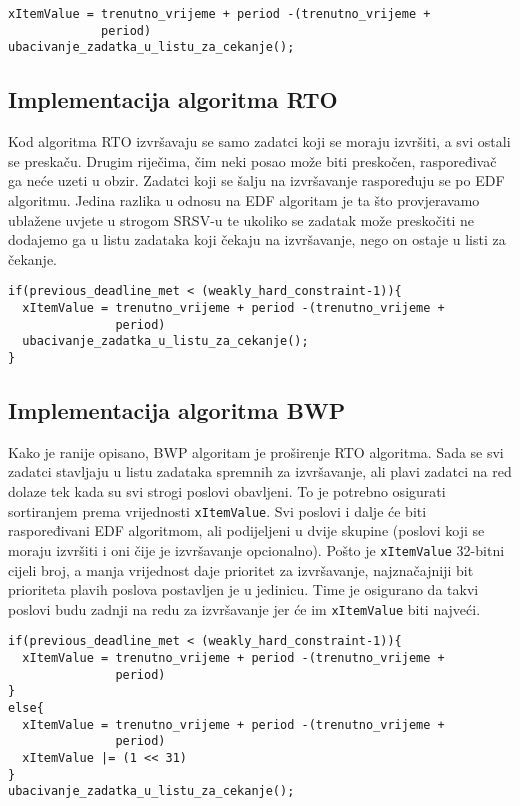 \documentclass[../zavrsni.tex]{subfiles}
\begin{document}
\begin{lstlisting}[style=CStyle,caption={Pseudokod implementacije algoritma EDF},captionpos=b]
xItemValue = trenutno_vrijeme + period -(trenutno_vrijeme + 
             period)
ubacivanje_zadatka_u_listu_za_cekanje();
\end{lstlisting}


\subsection{Implementacija algoritma RTO}

Kod algoritma RTO izvršavaju se samo zadatci koji se moraju izvršiti, a svi ostali se preskaču. Drugim riječima, čim neki posao 
može biti preskočen, raspoređivač ga neće uzeti u obzir. Zadatci koji se šalju na izvršavanje raspoređuju se po EDF algoritmu. Jedina razlika u odnosu
na EDF algoritam je ta što provjeravamo ublažene uvjete u strogom SRSV-u te ukoliko se zadatak može preskočiti ne dodajemo ga u 
listu zadataka koji čekaju na izvršavanje, nego on ostaje u listi za čekanje. 

\begin{lstlisting}[style=CStyle,caption={Pseudokod implementacije algoritma RTO},captionpos=b]
if(previous_deadline_met < (weakly_hard_constraint-1)){
  xItemValue = trenutno_vrijeme + period -(trenutno_vrijeme + 
               period)
  ubacivanje_zadatka_u_listu_za_cekanje();
}
\end{lstlisting}

\subsection{Implementacija algoritma BWP}

Kako je ranije opisano, BWP algoritam je proširenje RTO algoritma. Sada se svi zadatci stavljaju u listu zadataka spremnih za izvršavanje,
ali plavi zadatci na red dolaze tek kada su svi strogi poslovi obavljeni. To je potrebno osigurati sortiranjem prema vrijednosti
\texttt{xItemValue}. Svi poslovi i dalje će biti raspoređivani EDF algoritmom, ali podijeljeni u dvije skupine (poslovi koji se moraju
izvršiti i oni čije je izvršavanje opcionalno). Pošto je \texttt{xItemValue} 32-bitni cijeli broj, a manja vrijednost daje prioritet
za izvršavanje, najznačajniji bit prioriteta plavih poslova postavljen je u jedinicu. Time je osigurano da takvi poslovi budu 
zadnji na redu za izvršavanje jer će im \texttt{xItemValue} biti najveći.  

\begin{lstlisting}[style=CStyle,caption={Pseudokod implementacije algoritma BWP},captionpos=b]
if(previous_deadline_met < (weakly_hard_constraint-1)){
  xItemValue = trenutno_vrijeme + period -(trenutno_vrijeme + 
               period) 
}
else{
  xItemValue = trenutno_vrijeme + period -(trenutno_vrijeme + 
               period)
  xItemValue |= (1 << 31)
}
ubacivanje_zadatka_u_listu_za_cekanje();
\end{lstlisting}
\end{document}
